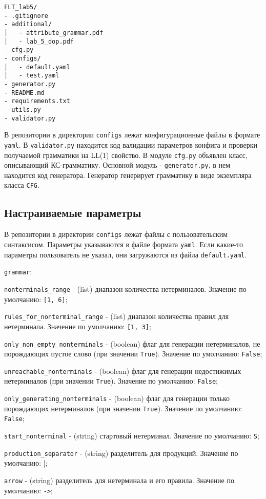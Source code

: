\documentclass{article}
\begin{document}
\begin{lstlisting}
FLT_lab5/
- .gitignore
- additional/
│   - attribute_grammar.pdf
│   - lab_5_dop.pdf
- cfg.py
- configs/
│   - default.yaml
│   - test.yaml
- generator.py
- README.md
- requirements.txt
- utils.py
- validator.py
\end{lstlisting}

\qquad В репозитории в директории \verb|configs| лежат конфигурационные файлы в формате \verb|yaml|. В \verb|validator.py| находится код валидации параметров конфига и проверки получаемой грамматики на LL(1) свойство. В модуле \verb|cfg.py| объявлен класс, описывающий КС-грамматику. Основной модуль - \verb|generator.py|, в нем находится код генератора. Генератор генерирует грамматику в виде экземпляра класса \verb|CFG|.

\subsection{Настраиваемые параметры}
\qquad В репозитории в директории \verb|configs| лежат файлы с пользовательским синтаксисом. Параметры указываются в файле формата \verb|yaml|. Если какие-то параметры пользователь не указал, они загружаются из файла \verb|default.yaml|.

\verb|grammar|:

\verb|nonterminals_range| - (list) диапазон количества нетерминалов. Значение по умолчанию: \verb|[1, 6]|;

\verb|rules_for_nonterminal_range| - (list) диапазон количества правил для нетерминала. Значение по умолчанию: \verb|[1, 3]|;

\verb|only_non_empty_nonterminals| - (boolean) флаг для генерации нетерминалов, не порождающих пустое слово (при значении \verb|True|). Значение по умолчанию: \verb|False|;

\verb|unreachable_nonterminals| - (boolean) флаг для генерации недостижимых нетерминалов (при значении \verb|True|). Значение по умолчанию: \verb|False|;

\verb|only_generating_nonterminals| - (boolean) флаг для генерации только порождающих нетерминалов (при значении \verb|True|). Значение по умолчанию: \verb|False|;

\verb|start_nonterminal| - (string) стартовый нетерминал. Значение по умолчанию: \verb|S|;

\verb|production_separator| - (string) разделитель для продукций. Значение по умолчанию: |;

\verb|arrow| - (string) разделитель для нетерминала и его правила. Значение по умолчанию: \verb|->|;
\end{document}
